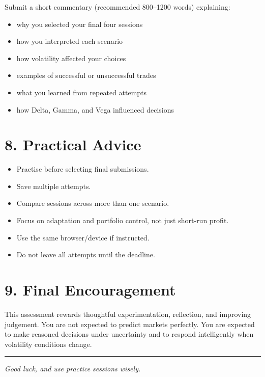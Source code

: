 \documentclass[11pt,a4paper]{article}
\begin{document}
Submit a short commentary (recommended 800--1200 words) explaining:
\begin{itemize}[leftmargin=1.5em]
\item why you selected your final four sessions
\item how you interpreted each scenario
\item how volatility affected your choices
\item examples of successful or unsuccessful trades
\item what you learned from repeated attempts
\item how Delta, Gamma, and Vega influenced decisions
\end{itemize}

\section*{8. Practical Advice}

\begin{itemize}[leftmargin=1.5em]
\item Practise before selecting final submissions.
\item Save multiple attempts.
\item Compare sessions across more than one scenario.
\item Focus on adaptation and portfolio control, not just short-run profit.
\item Use the same browser/device if instructed.
\item Do not leave all attempts until the deadline.
\end{itemize}

\section*{9. Final Encouragement}

This assessment rewards thoughtful experimentation, reflection, and improving judgement. You are not expected to predict markets perfectly. You are expected to make reasoned decisions under uncertainty and to respond intelligently when volatility conditions change.

\vspace{1em}
\hrule
\vspace{0.5em}

\begin{center}
\textit{Good luck, and use practice sessions wisely.}
\end{center}
\end{document}
